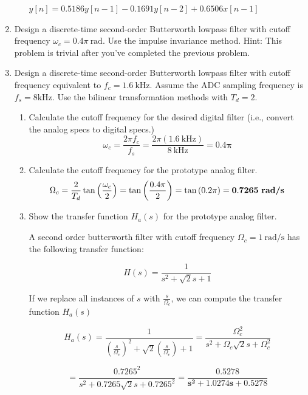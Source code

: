 \documentclass[fleqn]{article}
\begin{document}
\begin{enumerate}[nolistsep]
\begin{enumerate}[nolistsep]
				$y[n] = 0.5186y[n-1] - 0.1691y[n-2] + 0.6506x[n-1]$
		\end{enumerate}
		\item Design a discrete-time second-order Butterworth lowpass filter with cutoff frequency $\omega_c = 0.4\pi\ \text{rad}$. Use the impulse invariance method.
			Hint: This problem is trivial after you've completed the previous problem.
		\pagebreak
		\item Design a discrete-time second-order Butterworth lowpass filter with cutoff frequency equivalent to $f_c = 1.6\ \text{kHz}$. Assume the ADC sampling frequency is $f_s = 8 \text{kHz}$. Use the bilinear transformation methods with $T_d = 2$.
		\begin{enumerate}
			\item Calculate the cutoff frequency for the desired digital filter (i.e., convert the analog specs to digital specs.)
			\begin{equation*}
				\omega_c = \frac{2{\pi}f_c}{f_s} = \frac{2{\pi}(1.6\ \text{kHz})}{8\ \text{kHz}} = \mathbf{0.4\pi}
			\end{equation*}
			\item Calculate the cutoff frequency for the prototype analog filter.
			\begin{equation*}
				\Omega_c = \frac{2}{T_d}\tan{\left(\frac{\omega_c}{2}\right)} = \tan{\left(\frac{0.4\pi}{2}\right)} = \tan{(0.2\pi)} = \mathbf{0.7265\ \text{\textbf{rad/s}}}
			\end{equation*}
			\item Show the transfer function $H_a(s)$ for the prototype analog filter.
			
			A second order butterworth filter with cutoff frequency $\Omega_c = 1\ \text{rad/s}$ has the following transfer function:
			
			\begin{equation*}
				H(s) = \frac{1}{s^2 + \sqrt{2}s + 1}
			\end{equation*}
			
			If we replace all instances of $s$ with $\frac{s}{\Omega_c}$, we can compute the transfer function $H_a(s)$
			
			\begin{equation*}
				H_a(s) = \frac{1}{\left(\frac{s}{\Omega_c}\right)^2 + \sqrt{2}\left(\frac{s}{\Omega_c}\right) + 1} = \frac{\Omega_c^2}{s^2 + \Omega_c\sqrt{2}s + \Omega_c^2}
			\end{equation*}
			
			\begin{equation*}
				= \frac{0.7265^2}{s^2 + 0.7265\sqrt{2}s + 0.7265^2} = \mathbf{\frac{0.5278}{s^2 + 1.0274s + 0.5278}}
			\end{equation*}
			

\end{enumerate}
\end{enumerate}
\end{document}

